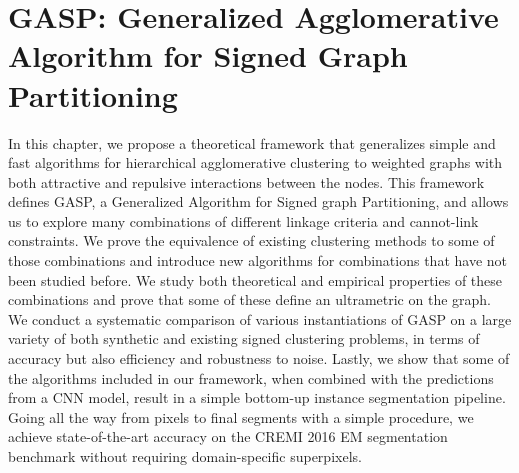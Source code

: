 
\chapter{GASP: Generalized Agglomerative Algorithm for Signed Graph Partitioning}\label{chapter:GASP}

In this chapter, we propose a theoretical framework that generalizes simple and fast algorithms for hierarchical agglomerative clustering to weighted graphs with both attractive and repulsive interactions between the nodes. This framework defines GASP, a Generalized Algorithm for Signed graph Partitioning, and allows us to explore many combinations of different linkage criteria and cannot-link constraints. 
We prove the equivalence of existing clustering methods to some of those combinations and introduce new algorithms for combinations that have not been studied before. 
We study both theoretical and empirical properties of these combinations and prove that some of these define an ultrametric on the graph.
We conduct a systematic comparison of various instantiations of GASP on a large variety of both synthetic and existing signed clustering problems, in terms of accuracy but also efficiency and robustness to noise. 
Lastly, we show that some of the algorithms included in our framework, when combined with the predictions from a CNN model, result in a simple bottom-up instance segmentation pipeline.
Going all the way from pixels to final segments with a simple procedure, we achieve state-of-the-art accuracy on the CREMI 2016 EM segmentation benchmark without requiring domain-specific superpixels.



